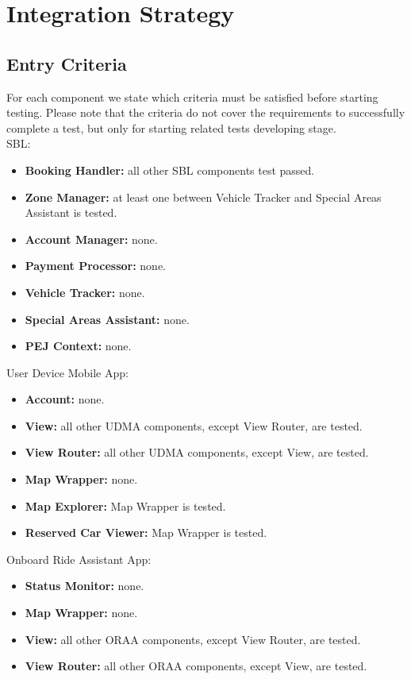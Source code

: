 \section{Integration Strategy}

\subsection{Entry Criteria}
For each component we state which criteria must be satisfied before starting testing. Please note that the criteria do not cover the requirements to successfully complete a test, but only for starting related tests developing stage.\\
SBL:
\begin{itemize}
    \item \textbf{Booking Handler:} all other SBL components test passed.
    \item \textbf{Zone Manager:} at least one between Vehicle Tracker and Special Areas Assistant is tested.
    \item \textbf{Account Manager:} none.
    \item \textbf{Payment Processor:} none.
    \item \textbf{Vehicle Tracker:} none.
    \item \textbf{Special Areas Assistant:} none.
    \item \textbf{PEJ Context:} none.
\end{itemize}
User Device Mobile App:
\begin{itemize}
    \item \textbf{Account:} none.
    \item \textbf{View:} all other UDMA components, except View Router, are tested.
    \item \textbf{View Router:} all other UDMA components, except View, are tested.
    \item \textbf{Map Wrapper:} none.
    \item \textbf{Map Explorer:} Map Wrapper is tested.
    \item \textbf{Reserved Car Viewer:} Map Wrapper is tested.
\end{itemize}
Onboard Ride Assistant App:
\begin{itemize}
    \item \textbf{Status Monitor:} none.
    \item \textbf{Map Wrapper:} none.
    \item \textbf{View:} all other ORAA components, except View Router, are tested.
    \item \textbf{View Router:} all other ORAA components, except View, are tested.
\end{itemize}
